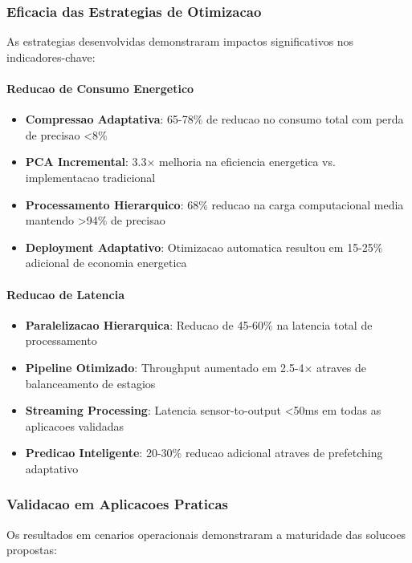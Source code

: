 \subsubsection{Eficacia das Estrategias de Otimizacao}
As estrategias desenvolvidas demonstraram impactos significativos nos indicadores-chave:

\paragraph{Reducao de Consumo Energetico}
\begin{itemize}
    \item \textbf{Compressao Adaptativa}: 65-78\% de reducao no consumo total com perda de precisao <8\%
    \item \textbf{PCA Incremental}: 3.3× melhoria na eficiencia energetica vs. implementacao tradicional
    \item \textbf{Processamento Hierarquico}: 68\% reducao na carga computacional media mantendo >94\% de precisao
    \item \textbf{Deployment Adaptativo}: Otimizacao automatica resultou em 15-25\% adicional de economia energetica
\end{itemize}

\paragraph{Reducao de Latencia}
\begin{itemize}
    \item \textbf{Paralelizacao Hierarquica}: Reducao de 45-60\% na latencia total de processamento
    \item \textbf{Pipeline Otimizado}: Throughput aumentado em 2.5-4× atraves de balanceamento de estagios
    \item \textbf{Streaming Processing}: Latencia sensor-to-output <50ms em todas as aplicacoes validadas
    \item \textbf{Predicao Inteligente}: 20-30\% reducao adicional atraves de prefetching adaptativo
\end{itemize}

\subsubsection{Validacao em Aplicacoes Praticas}
Os resultados em cenarios operacionais demonstraram a maturidade das solucoes propostas:

